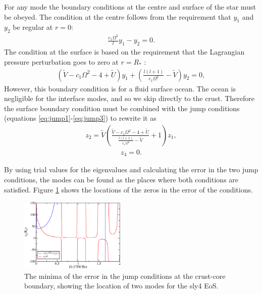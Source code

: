 \documentclass[fleqn,usenatbib]{mnras}
\begin{document}
\hspace{\parindent}For any mode the boundary conditions at the centre and surface of the star must be obeyed. The condition at the centre follows from the requirement that $y_1$ and $y_2$ be regular at $r=0$:
\begin{align}
\frac{c_1\Omega^2}{l}y_1-y_2=0.
\label{eq:core_condition}
\end{align}
\noindent The condition at the surface is based on the requirement that the Lagrangian pressure perturbation goes to zero at $r=R_*$ :
\begin{align}
\left(\tilde{V}-c_1\Omega^2-4+\tilde{U}\right)y_1+\left(\frac{l(l+1)}{c_1\Omega^2}-\tilde{V}\right)y_2=0,
\label{eq:surface_condition}
\end{align}
\noindent However, this boundary condition is for a fluid surface ocean. The ocean is negligible for the interface modes, and so we skip directly to the crust. Therefore the surface boundary condition must be combined with the jump conditions (equations \ref{eq:jump1}-\ref{eq:jump3}) to rewrite it as
\begin{align}
z_2=\tilde{V}\left(\frac{\tilde{V}-c_1\Omega^2-4+\tilde{U}}{\frac{l(l+1)}{c_1\Omega^2}-\tilde{V}}+1\right)z_1,
\label{eq:surface_boundary_modified_1}
\end{align}
\begin{align}
z_4=0.
\label{eq:surface_boundary_modified_2}
\end{align}



\hspace{\parindent}By using trial values for the eigenvalues and calculating the error in the two jump conditions, the modes can be found as the places where both conditions are satisfied. Figure \ref{fig:trace_minima} shows the locations of the zeros in the error of the conditions.

\begin{figure}
\centering
\includegraphics[width=0.45\textwidth,angle=0]{minima_new}
\caption{The minima of the error in the jump conditions at the crust-core boundary, showing the location of two modes for the sly4 EoS.}
\label{fig:trace_minima}
\end{figure}
\end{document}
